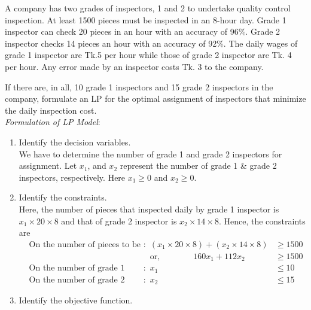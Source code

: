 \documentclass[../main-sheet.tex]{subfiles}
\begin{document}
\begin{ex}
    A company has two grades of inspectors, 1 and 2 to undertake quality control inspection. At least 1500 pieces must be inspected in an 8-hour day. Grade 1 inspector can check 20 pieces in an hour with an accuracy of 96\%. Grade 2 inspector checks 14 pieces an hour with an accuracy of 92\%. The daily wages of grade 1 inspector are Tk.5 per hour while those of grade 2 inspector are Tk. 4 per hour. Any error made by an inspector costs Tk. 3 to the company.


    If there are, in all, 10 grade 1 inspectors and 15 grade 2 inspectors in the company, formulate an LP for the optimal assignment of inspectors that minimize the daily inspection cost.\\


    \emph{Formulation of LP Model}:
    \begin{enumerate}[label=Step \arabic*:]
        \item Identify the decision variables.\\
        

              We have to determine the number of grade 1 and grade 2 inspectors for assignment. Let \(x_1\), and \(x_2\) represent the number of grade 1 \& grade 2 inspectors, respectively. Here \(x_1 \geq 0\) and \(x_2 \geq 0\).
        \item Identify the constraints.\\
              
        
        Here, the number of pieces that inspected daily by grade 1 inspector is \(x_1 \times 20\times 8\) and that of grade 2 inspector is \(x_2 \times 14\times 8\). Hence, the constraints are
              \begin{align*}
                   & \text{On the number of pieces to be inspected daily}: & (x_1\times 20\times 8) + (x_2\times 14\times 8) & \geq 1500 \\
                   &                                                       & \text{or,}\qquad\qquad 160x_1+112x_2                        & \geq 1500 \\
                   & \text{On the number of grade 1 inspector}:            & x_1                                             & \leq 10\\
                   & \text{On the number of grade 2 inspector}:            & x_2                                             & \leq 15
              \end{align*}
              \item Identify the objective function.\\
              

\end{enumerate}
\end{ex}
\end{document}
